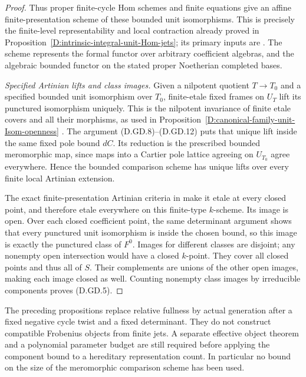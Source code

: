 \begin{proof}
Thus proper finite-cycle Hom schemes and finite equations
give an affine finite-presentation scheme of these bounded
unit isomorphisms. This is precisely the finite-level
representability and local contraction already proved in
Proposition~\ref{D:intrinsic-integral-unit-Hom-jets}; its
primary inputs are
\citet[Tags 08JY, 08K6, 08K9 and 088E]{StacksIntrinsicUnitHomD}.
The scheme represents the formal functor over arbitrary
coefficient algebras, and the algebraic bounded functor
on the stated proper Noetherian completed bases.

\emph{Specified Artinian lifts and class images.}
Given a nilpotent quotient $T\to T_0$ and a specified
bounded unit isomorphism over $T_0$, finite-etale fixed
frames on $U_T$ lift its punctured isomorphism uniquely.
This is the nilpotent invariance of finite etale covers
and all their morphisms, as used in
Proposition~\ref{D:canonical-family-unit-Isom-openness}
\citep[Tag 0BQB]{StacksIntrinsicUnitHomD}.
The argument (D.GD.8)--(D.GD.12) puts that unique lift
inside the same fixed pole bound $dC$. Its reduction is
the prescribed bounded meromorphic map, since maps into
a Cartier pole lattice agreeing on $U_{T_0}$ agree
everywhere. Hence the bounded comparison scheme has
unique lifts over every finite local Artinian extension.

The exact finite-presentation Artinian criteria in
\citet[Tags 02HT, 02HM and 00UR]{StacksIntrinsicUnitHomD}
make it etale at every closed point, and therefore
etale everywhere on this finite-type $k$-scheme. Its
image is open. Over each closed coefficient point, the
same determinant argument shows that every punctured
unit isomorphism is inside the chosen bound, so this
image is exactly the punctured class of $F^0$.
Images for different classes are disjoint; any nonempty
open intersection would have a closed $k$-point. They
cover all closed points and thus all of $S$. Their
complements are unions of the other open images, making
each image closed as well. Counting nonempty class
images by irreducible components proves (D.GD.5).
\end{proof}

\begin{remark}
The preceding propositions replace relative fullness by
actual generation after a fixed negative cycle twist and
a fixed determinant. They do not construct compatible
Frobenius objects from finite jets. A separate effective
object theorem and a polynomial parameter budget are still
required before applying the component bound to a hereditary
representation count. In particular no bound on the size
of the meromorphic comparison scheme has been used.
\end{remark}
